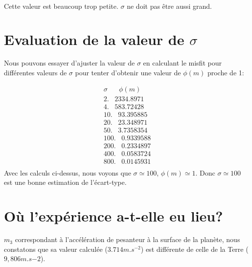 \documentclass[12pt,a4paper]{extreport}
\begin{document}
\paragraph{}
Cette valeur est beaucoup trop petite. $\sigma$ ne doit pas être aussi grand.
\section{Evaluation de la valeur de $\sigma$}

Nous pouvons essayer d'ajuster la valeur de $\sigma$ en calculant le misfit pour différentes valeurs de $\sigma$ pour tenter d'obtenir une valeur de $\phi(m)$ proche de 1:

\begin{equation}
	\begin{array}{c}
	
	\sigma \; \; \;\;\;\; \phi(m) \\
		 2.\; \;\;  2334.8971 \\

   4.\; \;\;   583.72428 \\

   10. \; \;\; 93.395885 \\

   20. \; \;\;  23.348971 \\

   50. \; \;\;  3.7358354 \\

   100. \; \;\; 0.9339588 \\

   200.  \; \;\; 0.2334897 \\

   400. \; \;\;  0.0583724 \\

   800. \; \;\;  0.0145931 \\
	\end{array}
\end{equation}
Avec les calculs ci-dessus, nous voyons que $\sigma \simeq 100$, $\phi(m) \simeq 1$.
Donc $\sigma \simeq 100$ est une bonne estimation de l'écart-type.

\section{Où l'expérience a-t-elle eu lieu?}
$m_3$ correspondant à l'accélération de pesanteur à la surface de la planète, nous constatons que sa valeur calculée ($3.714 m.s^{-2}$) est différente de celle de la Terre ($9,806 m.s{-2}$).
\end{document}
